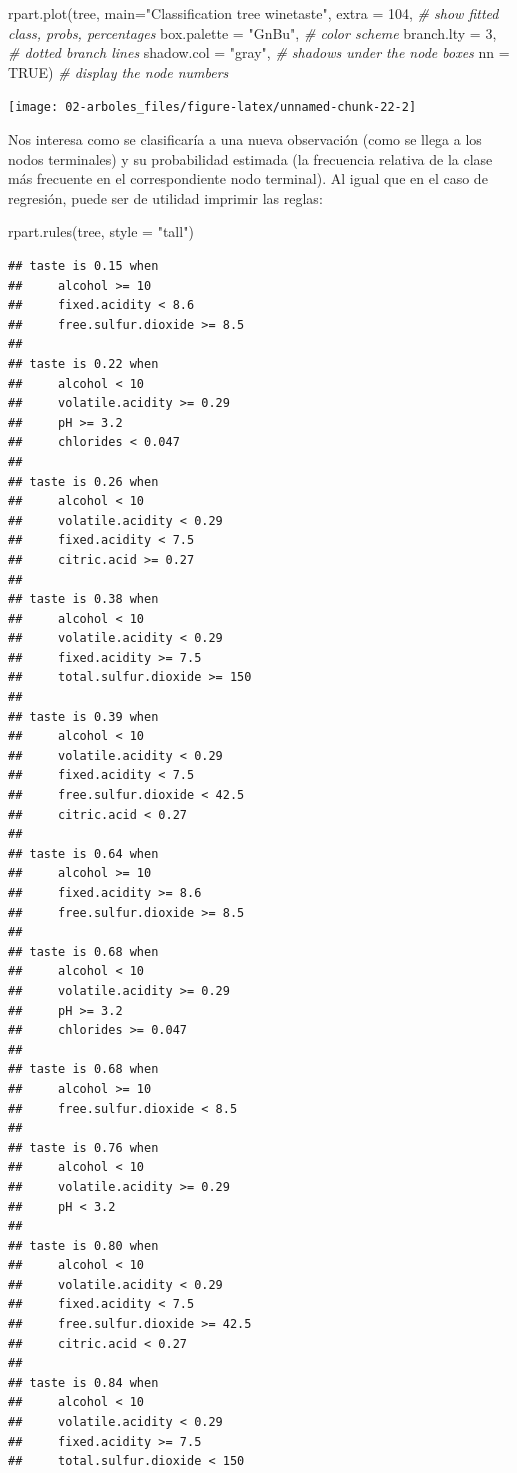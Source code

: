\documentclass[
  spanish,
]{book}
\newenvironment{Shaded}{\begin{snugshade}}{\end{snugshade}}
\newcommand{\AttributeTok}[1]{\textcolor[rgb]{0.77,0.63,0.00}{#1}}
\newcommand{\CommentTok}[1]{\textcolor[rgb]{0.56,0.35,0.01}{\textit{#1}}}
\newcommand{\ConstantTok}[1]{\textcolor[rgb]{0.00,0.00,0.00}{#1}}
\newcommand{\DecValTok}[1]{\textcolor[rgb]{0.00,0.00,0.81}{#1}}
\newcommand{\FunctionTok}[1]{\textcolor[rgb]{0.00,0.00,0.00}{#1}}
\newcommand{\NormalTok}[1]{#1}
\newcommand{\StringTok}[1]{\textcolor[rgb]{0.31,0.60,0.02}{#1}}
\theoremstyle{break}
\theoremstyle{definition}
\theoremstyle{definition}
\theoremstyle{definition}
\theoremstyle{definition}
\theoremstyle{remark}
\begin{document}
\begin{Shaded}
\begin{Highlighting}[]
\FunctionTok{rpart.plot}\NormalTok{(tree, }\AttributeTok{main=}\StringTok{"Classification tree winetaste"}\NormalTok{,}
           \AttributeTok{extra =} \DecValTok{104}\NormalTok{,          }\CommentTok{\# show fitted class, probs, percentages}
           \AttributeTok{box.palette =} \StringTok{"GnBu"}\NormalTok{, }\CommentTok{\# color scheme}
           \AttributeTok{branch.lty =} \DecValTok{3}\NormalTok{,       }\CommentTok{\# dotted branch lines}
           \AttributeTok{shadow.col =} \StringTok{"gray"}\NormalTok{,  }\CommentTok{\# shadows under the node boxes}
           \AttributeTok{nn =} \ConstantTok{TRUE}\NormalTok{)            }\CommentTok{\# display the node numbers }
\end{Highlighting}
\end{Shaded}

\begin{center}\texttt{[image: 02-arboles\_files/figure-latex/unnamed-chunk-22-2]} \end{center}

Nos interesa como se clasificaría a una nueva observación (como se llega a los nodos terminales) y su probabilidad estimada (la frecuencia relativa de la clase más frecuente en el correspondiente nodo terminal).
Al igual que en el caso de regresión, puede ser de utilidad imprimir las reglas:

\begin{Shaded}
\begin{Highlighting}[]
\FunctionTok{rpart.rules}\NormalTok{(tree, }\AttributeTok{style =} \StringTok{"tall"}\NormalTok{)}
\end{Highlighting}
\end{Shaded}

\begin{verbatim}
## taste is 0.15 when
##     alcohol >= 10
##     fixed.acidity < 8.6
##     free.sulfur.dioxide >= 8.5
## 
## taste is 0.22 when
##     alcohol < 10
##     volatile.acidity >= 0.29
##     pH >= 3.2
##     chlorides < 0.047
## 
## taste is 0.26 when
##     alcohol < 10
##     volatile.acidity < 0.29
##     fixed.acidity < 7.5
##     citric.acid >= 0.27
## 
## taste is 0.38 when
##     alcohol < 10
##     volatile.acidity < 0.29
##     fixed.acidity >= 7.5
##     total.sulfur.dioxide >= 150
## 
## taste is 0.39 when
##     alcohol < 10
##     volatile.acidity < 0.29
##     fixed.acidity < 7.5
##     free.sulfur.dioxide < 42.5
##     citric.acid < 0.27
## 
## taste is 0.64 when
##     alcohol >= 10
##     fixed.acidity >= 8.6
##     free.sulfur.dioxide >= 8.5
## 
## taste is 0.68 when
##     alcohol < 10
##     volatile.acidity >= 0.29
##     pH >= 3.2
##     chlorides >= 0.047
## 
## taste is 0.68 when
##     alcohol >= 10
##     free.sulfur.dioxide < 8.5
## 
## taste is 0.76 when
##     alcohol < 10
##     volatile.acidity >= 0.29
##     pH < 3.2
## 
## taste is 0.80 when
##     alcohol < 10
##     volatile.acidity < 0.29
##     fixed.acidity < 7.5
##     free.sulfur.dioxide >= 42.5
##     citric.acid < 0.27
## 
## taste is 0.84 when
##     alcohol < 10
##     volatile.acidity < 0.29
##     fixed.acidity >= 7.5
##     total.sulfur.dioxide < 150
\end{verbatim}
\end{document}
